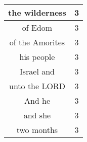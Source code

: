 \begin{center}
\begin{longtable}{|c|c|}
the wilderness & 3\\ \hline 
of Edom & 3\\ \hline 
of the Amorites & 3\\ \hline 
his people & 3\\ \hline 
Israel and & 3\\ \hline 
unto the LORD & 3\\ \hline 
And he & 3\\ \hline 
and she & 3\\ \hline 
two months & 3\\ \hline 
\end{longtable}
\end{center}





